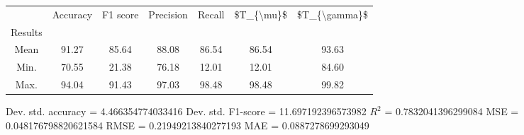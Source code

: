 \begin{tabular}{|c|c|c|c|c|c|c|}
\toprule
{} &  Accuracy &  F1 score &  Precision &  Recall &  \$T\_\{\textbackslash mu\}\$ &  \$T\_\{\textbackslash gamma\}\$ \\
Results &           &           &            &         &            &               \\
\hline
Mean    &     91.27 &     85.64 &      88.08 &   86.54 &      86.54 &         93.63 \\
Min.    &     70.55 &     21.38 &      76.18 &   12.01 &      12.01 &         84.60 \\
Max.    &     94.04 &     91.43 &      97.03 &   98.48 &      98.48 &         99.82 \\
\bottomrule
\end{tabular}

 Dev. std. accuracy = 4.466354774033416
 Dev. std. F1-score = 11.697192396573982
 $R^2$ = 0.7832041396299084
 MSE = 0.048176798820621584
 RMSE = 0.21949213840277193
 MAE = 0.0887278699293049